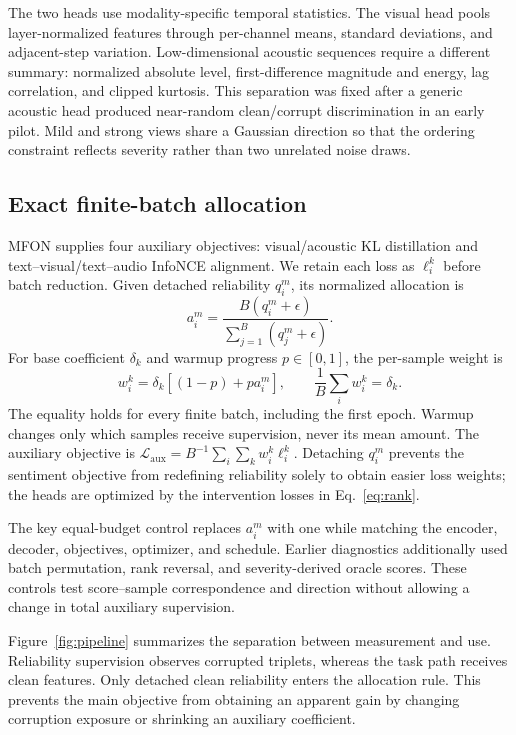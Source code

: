 \documentclass{article}
\begin{document}
The two heads use modality-specific temporal statistics. The visual head pools layer-normalized features through per-channel means, standard deviations, and adjacent-step variation. Low-dimensional acoustic sequences require a different summary: normalized absolute level, first-difference magnitude and energy, lag correlation, and clipped kurtosis. This separation was fixed after a generic acoustic head produced near-random clean/corrupt discrimination in an early pilot. Mild and strong views share a Gaussian direction so that the ordering constraint reflects severity rather than two unrelated noise draws.

\subsection{Exact finite-batch allocation}

MFON supplies four auxiliary objectives: visual/acoustic KL distillation and text--visual/text--audio InfoNCE alignment. We retain each loss as $\ell_i^k$ before batch reduction. Given detached reliability $q_i^m$, its normalized allocation is
\begin{equation}
a_i^m=\frac{B(q_i^m+\epsilon)}{\sum_{j=1}^{B}(q_j^m+\epsilon)}.
\label{eq:allocation}
\end{equation}
For base coefficient $\delta_k$ and warmup progress $p\in[0,1]$, the per-sample weight is
\begin{equation}
w_i^k=\delta_k\left[(1-p)+p a_i^m\right],\qquad
\frac{1}{B}\sum_iw_i^k=\delta_k.
\label{eq:budget}
\end{equation}
The equality holds for every finite batch, including the first epoch. Warmup changes only which samples receive supervision, never its mean amount. The auxiliary objective is $\mathcal{L}_{\mathrm{aux}}=B^{-1}\sum_i\sum_k w_i^k\ell_i^k$. Detaching $q_i^m$ prevents the sentiment objective from redefining reliability solely to obtain easier loss weights; the heads are optimized by the intervention losses in Eq.~\eqref{eq:rank}.

The key equal-budget control replaces $a_i^m$ with one while matching the encoder, decoder, objectives, optimizer, and schedule. Earlier diagnostics additionally used batch permutation, rank reversal, and severity-derived oracle scores. These controls test score--sample correspondence and direction without allowing a change in total auxiliary supervision.

Figure~\ref{fig:pipeline} summarizes the separation between measurement and use. Reliability supervision observes corrupted triplets, whereas the task path receives clean features. Only detached clean reliability enters the allocation rule. This prevents the main objective from obtaining an apparent gain by changing corruption exposure or shrinking an auxiliary coefficient.
\end{document}

